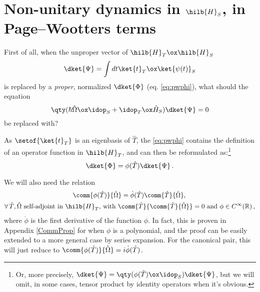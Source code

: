 \section{Non-unitary dynamics in $\hilb{H}_S$, in Page--Wootters terms}
\label{non-unitary-pw}

First of all,
when the unproper vector of $\hilb{H}_T \ox \hilb{H}_S$
\begin{equation}
  \dket{\Psi} = \int dt \ket{t}_{T} \ox \ket{\psi(t)}_{S}
\end{equation}
is replaced by a \emph{proper}, normalized $\dket{\Phi}$ (eq. \ref{eq:pwphi}),
what should the equation
\begin{equation}\label{eq:pwwd}
  \qty(\hbar\hat{\Omega} \ox \idop_S + \idop_T \ox \hat{H}_S)\dket{\Psi} = 0
\end{equation}
be replaced with?

As $\setof{\ket{t}_T}$ is an eigenbasis of $\hat{T}$, the \eqref{eq:pwphi}
contains the definition of an operator function in $\hilb{H}_T$,
and can then be reformulated as:\footnote{
  Or, more precisely, $\dket{\Psi} = \qty( \phi(\hat{T}) \ox \idop_S ) \dket{\Psi}$,
  but we will omit, in some cases,
  tensor product by identity operators
  when it's obvious.
}
\begin{equation}
  \dket{\Phi} = \phi(\hat{T})\dket{\Psi} \, \text{.}
\end{equation}

We will also need the relation
\begin{multline}\label{eq:fcomm}
  \comm{\phi(\hat{T})}{\hat{\Omega}} = \dot{\phi}(\hat{T}) \comm{\hat{T}}{\hat{\Omega}}, \,
    \\
    \forall \, \hat{T}, \hat{\Omega} \text{ self-adjoint in } \hilb{H}_T
    \text{, with }
    \comm{\hat{T}}{\comm{\hat{T}}{\hat{\Omega}}} = 0
    \text{ and }
    \phi \in C^{\infty}(\mathbb{R}) \, \text{,}
\end{multline}
where $\dot{\phi}$ is the first derivative of the function $\phi$.
In fact, this is proven in Appendix \ref{CommProp} for when $\phi$ is a polynomial,
and the proof can be easily extended to a more general case by series expansion.
For the canonical pair, this will just reduce to $\comm{\phi(\hat{T})}{\hat{\Omega}} = i \dot{\phi} (\hat{T})$.

